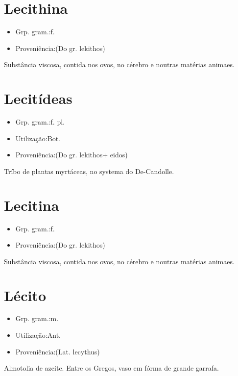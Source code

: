\section{Lecithina}
\begin{itemize}
\item {Grp. gram.:f.}
\end{itemize}
\begin{itemize}
\item {Proveniência:(Do gr. \textunderscore lekithos\textunderscore )}
\end{itemize}
Substância viscosa, contida nos ovos, no cérebro e noutras matérias animaes.
\section{Lecitídeas}
\begin{itemize}
\item {Grp. gram.:f. pl.}
\end{itemize}
\begin{itemize}
\item {Utilização:Bot.}
\end{itemize}
\begin{itemize}
\item {Proveniência:(Do gr. \textunderscore lekithos\textunderscore  + \textunderscore eidos\textunderscore )}
\end{itemize}
Tríbo de plantas myrtáceas, no systema do De-Candolle.
\section{Lecitina}
\begin{itemize}
\item {Grp. gram.:f.}
\end{itemize}
\begin{itemize}
\item {Proveniência:(Do gr. \textunderscore lekithos\textunderscore )}
\end{itemize}
Substância viscosa, contida nos ovos, no cérebro e noutras matérias animaes.
\section{Lécito}
\begin{itemize}
\item {Grp. gram.:m.}
\end{itemize}
\begin{itemize}
\item {Utilização:Ant.}
\end{itemize}
\begin{itemize}
\item {Proveniência:(Lat. \textunderscore lecythus\textunderscore )}
\end{itemize}
Almotolia de azeite.
Entre os Gregos, vaso em fórma de grande garrafa.
